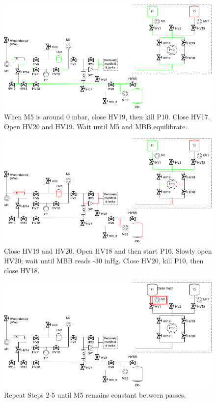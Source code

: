\documentclass[a4paper,10pt]{article}
\begin{document}
\begin{figure}[htbp!]
 \centering
 \includegraphics[width=\textwidth]{./mash-cleaning-04.png}
 \caption{When M5 is around 0 mbar, close HV19, then kill P10.  Close HV17.  Open HV20 and HV19.  Wait until M5 and MBB equilibrate.}
 \label{d}
\end{figure}


\begin{figure}[htbp!]
 \centering
 \includegraphics[width=\textwidth]{./mash-cleaning-05.png}
 \caption{Close HV19 and HV20.  Open HV18 and then start P10.  Slowly open HV20; wait until MBB reads -30 inHg.  Close HV20, kill P10, then close HV18.}
 \label{e}
\end{figure}

\begin{figure}[htbp!]
 \centering
 \includegraphics[width=\textwidth]{./mash-cleaning-06.png}
 \caption{Repeat Steps 2-5 until M5 remains constant between passes.}
 \label{f}
\end{figure}
\end{document}
